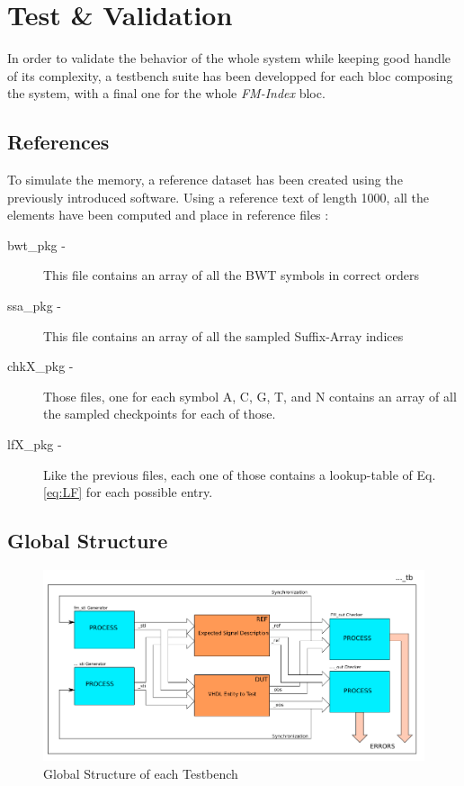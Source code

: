 \section{Test \& Validation}

In order to validate the behavior of the whole system while keeping good handle of its complexity, a testbench suite has been developped for each bloc composing the system, with a final one for the whole \textsl{FM-Index} bloc. \\

\subsection{References}
To simulate the memory, a reference dataset has been created using the previously introduced software. Using a reference text of length 1000, all the elements have been computed and place in reference files :

\begin{description}
\item [bwt\_pkg -] This file contains an array of all the BWT symbols in correct orders
\item [ssa\_pkg -] This file contains an array of all the sampled Suffix-Array indices
\item [chkX\_pkg -] Those files, one for each symbol A, C, G, T, and N contains an array of all the sampled checkpoints for each of those.
\item [lfX\_pkg -] Like the previous files, each one of those contains a lookup-table of Eq. \ref{eq:LF} for each possible entry.
\end{description}

\subsection{Global Structure}

\begin{figure}[H]
 \includegraphics[scale = 0.4]{Figures/TB_struct.png}
    \caption{Global Structure of each Testbench}
    \label{fig:Tb_struct}
\end{figure}

